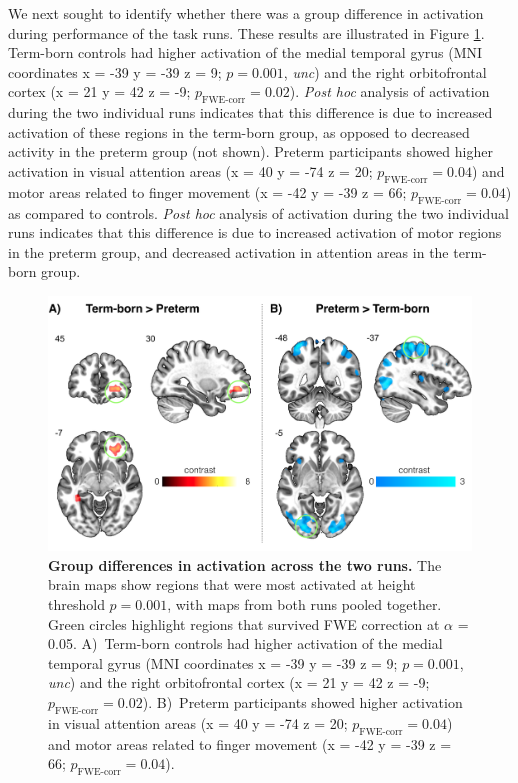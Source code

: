 We next sought to identify whether there was a group difference in activation during performance of the task runs. These results are illustrated in Figure  \ref{fig:GroupActivation}. Term-born controls had higher activation of the medial temporal gyrus (MNI coordinates x = -39 y = -39 z = 9; $p = 0.001$, \textit{unc}) and the right orbitofrontal cortex (x = 21 y = 42 z = -9; $p_{\text{FWE-corr}} = 0.02$). \textit{Post hoc} analysis of activation during the two individual runs indicates that this difference is due to increased activation of these regions in the term-born group, as opposed to decreased activity in the preterm group (not shown). Preterm participants showed higher activation in visual attention areas (x = 40 y = -74 z = 20; $p_{\text{FWE-corr}} = 0.04$) and motor areas related to finger movement (x = -42 y = -39  z = 66; $p_{\text{FWE-corr}} = 0.04$) as compared to controls. \textit{Post hoc} analysis of activation during the two individual runs indicates that this difference is due to increased activation of motor regions in the preterm group, and decreased activation in attention areas in the term-born group.


\begin{figure}[h]
\vspace{3mm}
\centering\includegraphics[width=1\linewidth]{images/Ch4/Ch4_CtrlVsPre_ctrl_pre.png}
\caption{\textbf{Group differences in activation across the two runs.} The brain maps show regions that were most activated at height threshold $p = 0.001$, with maps from both runs pooled together. Green circles highlight regions that survived FWE correction at $\alpha$ = 0.05. A)~Term-born controls had higher activation of the medial temporal gyrus (MNI coordinates x = -39 y = -39 z = 9; $p = 0.001$, \textit{unc}) and the right orbitofrontal cortex (x = 21 y = 42 z = -9; $p_{\text{FWE-corr}} = 0.02$). B)~Preterm participants showed higher activation in visual attention areas (x = 40 y = -74 z = 20; $p_{\text{FWE-corr}} = 0.04$) and motor areas related to finger movement (x = -42 y = -39  z = 66; $p_{\text{FWE-corr}} = 0.04$).} \label{fig:GroupActivation}
\end{figure} 

